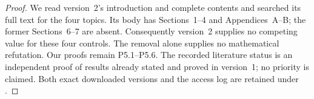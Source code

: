 \begin{proof}
We read version~2's introduction and complete contents and searched
its full text for the four topics. Its body has Sections~1--4 and
Appendices~A--B; the former Sections~6--7 are absent. Consequently
version~2 supplies no competing value for these four controls.
The removal alone supplies no mathematical refutation. Our proofs
remain P5.1--P5.6. The recorded literature status is an independent
proof of results already stated and proved in version~1; no priority
is claimed. Both exact downloaded versions and the access log are
retained under .
\end{proof}
